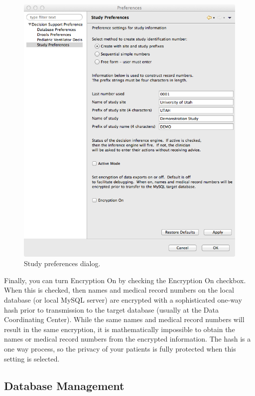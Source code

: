 \begin{figure}[htbp] 
   \centering
   \includegraphics[width=\textwidth]{StudyPreferences} 
   \caption{Study preferences dialog.}
   \label{fig:studyPref}
\end{figure}

Finally, you can turn Encryption On by checking the Encryption On checkbox.  When this is checked, then names and medical
record numbers on the local database (or local MySQL server) are encrypted with a sophisticated one-way hash prior to
transmission to the target database (usually at the Data Coordinating Center).  While the same names and medical record numbers
will result in the same encryption, it is mathematically impossible to obtain the names or medical record numbers from the
encrypted information.  The hash is a one way process, so the privacy of your patients is fully protected when this setting
is selected.

\subsection{Database Management\label{section:dataManagement}}

